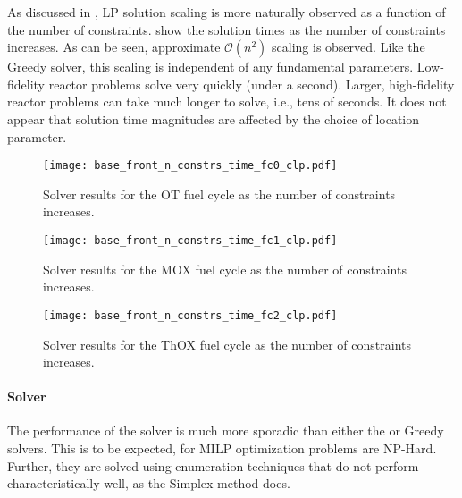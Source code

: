 As discussed in , LP solution scaling is more naturally
observed as a function of the number of
constraints. 
show the \clp solution times as the number of constraints increases. As can be
seen, approximate $\mathcal{O}(n^2)$ scaling is observed. Like the Greedy
solver, this scaling is independent of any fundamental parameters. Low-fidelity
reactor problems solve very quickly (under a second). Larger, high-fidelity
reactor problems can take much longer to solve, i.e., tens of seconds.  It does
not appear that solution time magnitudes are affected by the choice of location
parameter.

\begin{figure}[h!]
  \begin{center}
    \texttt{[image: base\_front\_n\_constrs\_time\_fc0\_clp.pdf]}
    \caption{
      \label{fig:base_front_n_constrs_time_fc0_clp}
      \clp Solver results for the OT fuel cycle as the number of constraints
      increases.
      }
  \end{center}
\end{figure}

\begin{figure}[h!]
  \begin{center}
    \texttt{[image: base\_front\_n\_constrs\_time\_fc1\_clp.pdf]}
    \caption{
      \label{fig:base_front_n_constrs_time_fc1_clp}
      \clp Solver results for the MOX fuel cycle as the number of constraints
      increases.
      }
  \end{center}
\end{figure}

\begin{figure}[h!]
  \begin{center}
    \texttt{[image: base\_front\_n\_constrs\_time\_fc2\_clp.pdf]}
    \caption{
      \label{fig:base_front_n_constrs_time_fc2_clp}
      \clp Solver results for the ThOX fuel cycle as the number of constraints
      increases.
      }
  \end{center}
\end{figure}

\paragraph{\cbc Solver}

The performance of the \cbc solver is much more sporadic than either the \clp or
Greedy solvers. This is to be expected, for MILP optimization problems are
NP-Hard. Further, they are solved using enumeration techniques that do not
perform characteristically well, as the Simplex method does. 

